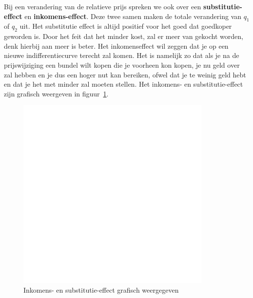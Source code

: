Bij een verandering van de relatieve prijs spreken we ook over een \textbf{substitutie-effect} en \textbf{inkomens-effect}. Deze twee samen maken de totale verandering van $q_1$ of $q_2$ uit. Het substitutie effect is altijd positief voor het goed dat goedkoper geworden is. Door het feit dat het minder kost, zal er meer van gekocht worden, denk hierbij aan meer is beter. Het inkomenseffect wil zeggen dat je op een nieuwe indifferentiecurve terecht zal komen. Het is namelijk zo dat als je na de prijswijziging een bundel wilt kopen die je voorheen kon kopen, je nu geld over zal hebben en je dus een hoger nut kan bereiken, ofwel dat je te weinig geld hebt en dat je het met minder zal moeten stellen. Het inkomens- en substitutie-effect zijn grafisch weergeven in figuur~\ref{fig:inkomensEnSubstitutieEffect}.
\begin{figure}[htbp]
	\centering
	\includegraphics[scale=0.4]{Images/white.png}
	\caption{Inkomens- en substitutie-effect grafisch weergegeven}
	\label{fig:inkomensEnSubstitutieEffect}
\end{figure}


